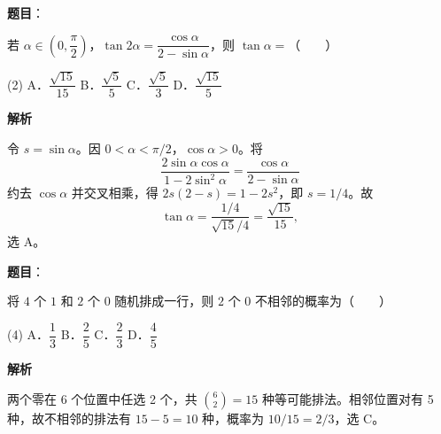 \begin{answer}

\textbf{题目}：

若 $\alpha\in\left(0,\dfrac\pi2\right)$，$\tan2\alpha=\dfrac{\cos\alpha}{2-\sin\alpha}$，则 $\tan\alpha=$\mbox{（　　）}

\begin{gkopts}(2)
\task A．$\dfrac{\sqrt{15}}{15}$
\task B．$\dfrac{\sqrt5}{5}$
\task C．$\dfrac{\sqrt5}{3}$
\task D．$\dfrac{\sqrt{15}}5$
\end{gkopts}

\textbf{解析}

令 $s=\sin\alpha$。因 $0<\alpha<\pi/2$，$\cos\alpha>0$。将
\nopagebreak[4]
\[
\frac{2\sin\alpha\cos\alpha}{1-2\sin^2\alpha}
=\frac{\cos\alpha}{2-\sin\alpha}
\]
约去 $\cos\alpha$ 并交叉相乘，得 $2s(2-s)=1-2s^2$，即 $s=1/4$。故
\nopagebreak[4]
\[
\tan\alpha=\frac{1/4}{\sqrt{15}/4}=\frac{\sqrt{15}}{15},
\]
选 A。


\end{answer}
\begin{answer}

\textbf{题目}：

将 $4$ 个 $1$ 和 $2$ 个 $0$ 随机排成一行，则 $2$ 个 $0$ 不相邻的概率为\mbox{（　　）}

\begin{gkopts}(4)
\task A．$\dfrac13$
\task B．$\dfrac25$
\task C．$\dfrac23$
\task D．$\dfrac45$
\end{gkopts}

\textbf{解析}

两个零在 6 个位置中任选 2 个，共 $\binom62=15$ 种等可能排法。相邻位置对有 5 种，故不相邻的排法有 $15-5=10$ 种，概率为 $10/15=2/3$，选 C。


\end{answer}
